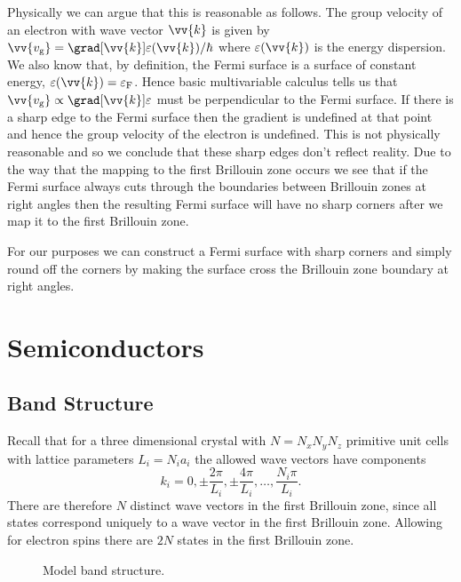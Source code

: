 \documentclass[fleqn]{NotesClass}
\newcommand*{\fermi}{\mathrm{F}}
\begin{document}
    Physically we can argue that this is reasonable as follows.
    The group velocity of an electron with wave vector \(\vv{k}\) is given by \(\vv{v_{\mathrm{g}}} = \grad[\vv{k}]\varepsilon(\vv{k})/\hbar\) where \(\varepsilon(\vv{k})\) is the energy dispersion.
    We also know that, by definition, the Fermi surface is a surface of constant energy, \(\varepsilon(\vv{k}) = \varepsilon_{\fermi}\).
    Hence basic multivariable calculus tells us that \(\vv{v_{\mathrm{g}}} \propto \grad[\vv{k}]\varepsilon\) must be perpendicular to the Fermi surface.
    If there is a sharp edge to the Fermi surface then the gradient is undefined at that point and hence the group velocity of the electron is undefined.
    This is not physically reasonable and so we conclude that these sharp edges don't reflect reality.
    Due to the way that the mapping to the first Brillouin zone occurs we see that if the Fermi surface always cuts through the boundaries between Brillouin zones at right angles then the resulting Fermi surface will have no sharp corners after we map it to the first Brillouin zone.
    
    For our purposes we can construct a Fermi surface with sharp corners and simply round off the corners by making the surface cross the Brillouin zone boundary at right angles.
    
    \chapter{Semiconductors}
    \section{Band Structure}
    Recall that for a three dimensional crystal with \(N = N_x N_y N_z\) primitive unit cells with lattice parameters \(L_i = N_i a_i\) the allowed wave vectors have components
    \begin{equation}
        k_i = 0, \pm \frac{2\pi}{L_i}, \pm \frac{4\pi}{L_i}, \dotsc, \frac{N_i\pi}{L_i}.
    \end{equation}
    There are therefore \(N\) distinct wave vectors in the first Brillouin zone, since all states correspond uniquely to a wave vector in the first Brillouin zone.
    Allowing for electron spins there are \(2N\) states in the first Brillouin zone.
    
    \begin{figure}
        \caption{Model band structure.}
        \label{fig:model band structure}
    \end{figure}
    
\end{document}
